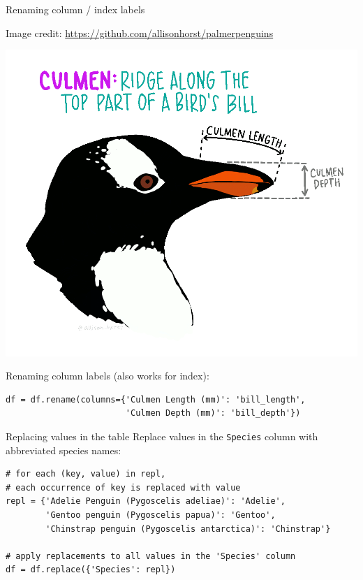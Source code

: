 \documentclass[aspectratio=169,usenames,dvipsnames]{beamer}
\begin{document}
\begin{frame}[fragile]{Renaming column / index labels}
\begin{reference}
\footnotesize Image credit: \url{https://github.com/allisonhorst/palmerpenguins}
\end{reference}
\includegraphics[height=0.5\textheight]{fig/culmen_depth}

Renaming column labels (also works for index):
\begin{lstlisting}
df = df.rename(columns={'Culmen Length (mm)': 'bill_length',
                        'Culmen Depth (mm)': 'bill_depth'})
\end{lstlisting}
\end{frame}

\begin{frame}[fragile]{Replacing values in the table}
Replace values in the \texttt{Species} column with abbreviated species names:
\begin{lstlisting}
# for each (key, value) in repl,
# each occurrence of key is replaced with value
repl = {'Adelie Penguin (Pygoscelis adeliae)': 'Adelie',
        'Gentoo penguin (Pygoscelis papua)': 'Gentoo',
        'Chinstrap penguin (Pygoscelis antarctica)': 'Chinstrap'}

# apply replacements to all values in the 'Species' column
df = df.replace({'Species': repl})
\end{lstlisting}
\end{frame}
\end{document}
